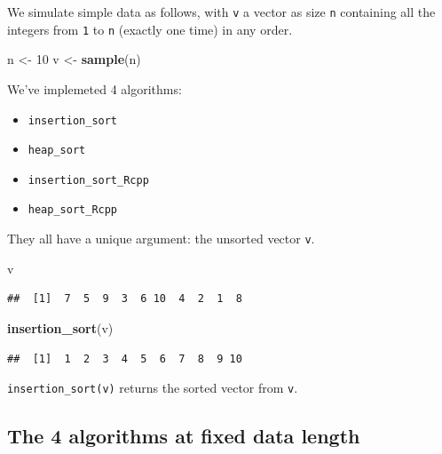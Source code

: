 \documentclass[
]{article}
\newenvironment{Shaded}{\begin{snugshade}}{\end{snugshade}}
\newcommand{\DecValTok}[1]{\textcolor[rgb]{0.00,0.00,0.81}{#1}}
\newcommand{\FunctionTok}[1]{\textcolor[rgb]{0.13,0.29,0.53}{\textbf{#1}}}
\newcommand{\NormalTok}[1]{#1}
\newcommand{\OtherTok}[1]{\textcolor[rgb]{0.56,0.35,0.01}{#1}}
\providecommand{\tightlist}{%
  \setlength{\itemsep}{0pt}\setlength{\parskip}{0pt}}
\begin{document}
We simulate simple data as follows, with \texttt{v} a vector as size
\texttt{n} containing all the integers from \texttt{1} to \texttt{n}
(exactly one time) in any order.

\begin{Shaded}
\begin{Highlighting}[]
\NormalTok{n }\OtherTok{\textless{}{-}} \DecValTok{10}
\NormalTok{v }\OtherTok{\textless{}{-}} \FunctionTok{sample}\NormalTok{(n)}
\end{Highlighting}
\end{Shaded}

We've implemeted 4 algorithms:

\begin{itemize}
\tightlist
\item
  \texttt{insertion\_sort}
\item
  \texttt{heap\_sort}
\item
  \texttt{insertion\_sort\_Rcpp}
\item
  \texttt{heap\_sort\_Rcpp}
\end{itemize}

They all have a unique argument: the unsorted vector \texttt{v}.

\begin{Shaded}
\begin{Highlighting}[]
\NormalTok{v}
\end{Highlighting}
\end{Shaded}

\begin{verbatim}
##  [1]  7  5  9  3  6 10  4  2  1  8
\end{verbatim}

\begin{Shaded}
\begin{Highlighting}[]
\FunctionTok{insertion\_sort}\NormalTok{(v)}
\end{Highlighting}
\end{Shaded}

\begin{verbatim}
##  [1]  1  2  3  4  5  6  7  8  9 10
\end{verbatim}

\texttt{insertion\_sort(v)} returns the sorted vector from \texttt{v}.

\subsection{The 4 algorithms at fixed data
length}\label{the-4-algorithms-at-fixed-data-length}
\end{document}
